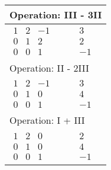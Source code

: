 \begin{longtable}{p{4cm}|p{3cm}}
    \multicolumn{2}{p{\dimexpr4cm+3cm+2\tabcolsep\relax}}{Operation: III - 3II}               \\\hline\pagebreak[0]

    $\displaystyle\begin{matrix}
                          1 & 2 & -1 \\
                          0 & 1 & 2  \\
                          0 & 0 & 1
                      \end{matrix}$                    &
    $\displaystyle\begin{matrix}
                          3 \\ 2 \\ -1
                      \end{matrix}$                                                               \\\hline

    \multicolumn{2}{p{\dimexpr4cm+3cm+2\tabcolsep\relax}}{Operation: II - 2III}               \\\hline\pagebreak[0]

    $\displaystyle\begin{matrix}
                          1 & 2 & -1 \\
                          0 & 1 & 0  \\
                          0 & 0 & 1
                      \end{matrix}$                    &
    $\displaystyle\begin{matrix}
                          3 \\ 4 \\ -1
                      \end{matrix}$                                                               \\\hline

    \multicolumn{2}{p{\dimexpr4cm+3cm+2\tabcolsep\relax}}{Operation: I + III}                 \\\hline\pagebreak[0]

    $\displaystyle\begin{matrix}
                          1 & 2 & 0 \\
                          0 & 1 & 0 \\
                          0 & 0 & 1
                      \end{matrix}$                    &
    $\displaystyle\begin{matrix}
                          2 \\ 4 \\ -1
                      \end{matrix}$                                                               \\\hline


\end{longtable}

